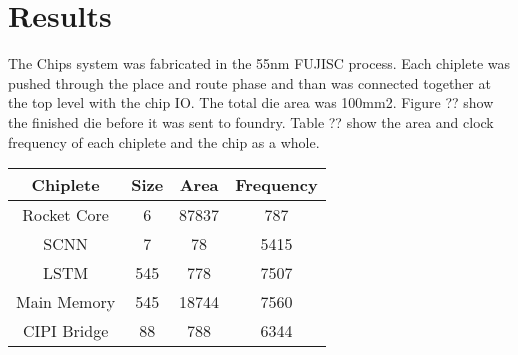 \documentclass[../main.tex]{subfiles}
\begin{document}
\section{Results}
The Chips system was fabricated in the 55nm FUJISC process. Each chiplete was pushed through the place and route phase and than was connected together at the top level with the chip IO. The total die area was 100mm2. Figure ?? show the finished die before it was sent to foundry. Table ?? show the area and clock frequency of each chiplete and the chip as a whole.

\begin{center}
\begin{tabular}{||c c c c||}
 \hline
 Chiplete & Size & Area & Frequency \\ [0.5ex] 
 \hline\hline
 Rocket Core & 6 & 87837 & 787 \\ 
 \hline
 SCNN & 7 & 78 & 5415 \\
 \hline
 LSTM & 545 & 778 & 7507 \\
 \hline
 Main Memory & 545 & 18744 & 7560 \\
 \hline
 CIPI Bridge & 88 & 788 & 6344 \\ [1ex] 
 \hline
\end{tabular}
\end{center}
\end{document}
